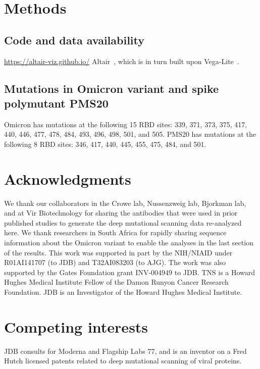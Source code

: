 \documentclass[9pt,twocolumn,twoside]{gsajnl_modified}
\begin{document}
{\small

\section{Methods}
\subsection{Code and data availability}

\url{https://altair-viz.github.io/} Altair~\citep{VanderPlas2018}, which is in turn built upon Vega-Lite~\citep{Satyanarayan2017}.

\subsection{Mutations in Omicron variant and spike polymutant PMS20}
Omicron has mutations at the following 15 RBD sites: 339, 371, 373, 375, 417, 440, 446, 477, 478, 484, 493, 496, 498, 501, and 505.
PMS20 has mutations at the following 8 RBD sites: 346, 417, 440, 445, 455, 475, 484, and 501.


\section{Acknowledgments}
We thank our collaborators in the Crowe lab, Nussenzweig lab, Bjorkman lab, and at Vir Biotechnology for sharing the antibodies that were used in prior published studies to generate the deep mutational scanning data re-analyzed here.
We thank researchers in South Africa for rapidly sharing sequence information about the Omicron variant to enable the analyses in the last section of the results.
This work was supported in part by the NIH/NIAID under R01AI141707 (to JDB) and T32AI083203 (to AJG).
The work was also supported by the Gates Foundation grant INV-004949 to JDB.
TNS is a Howard Hughes Medical Institute Fellow of the Damon Runyon Cancer Research Foundation.
JDB is an Investigator of the Howard Hughes Medical Institute.

\section{Competing interests}
JDB consults for Moderna and Flagship Labs 77, and is an inventor on a Fred Hutch licensed patents related to deep mutational scanning of viral proteins.

}


\end{document}
